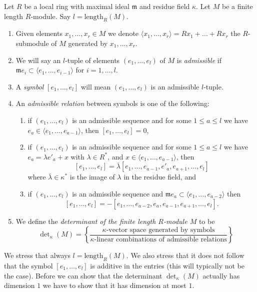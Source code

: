 \begin{definition}
\label{definition-determinant}
Let $R$ be a local ring with maximal ideal $\mathfrak m$ and
residue field $\kappa$. Let $M$ be a finite length $R$-module.
Say $l = \text{length}_R(M)$.
\begin{enumerate}
\item Given elements $x_1, \ldots, x_r \in M$ we denote
$\langle x_1, \ldots, x_r \rangle = Rx_1 + \ldots + Rx_r$ the
$R$-submodule of $M$ generated by $x_1, \ldots, x_r$.
\item We will say an $l$-tuple of elements
$(e_1, \ldots, e_l)$ of $M$ is {\it admissible} if
$\mathfrak m e_i \subset \langle e_1, \ldots, e_{i - 1} \rangle$
for $i = 1, \ldots, l$.
\item A {\it symbol} $[e_1, \ldots, e_l]$ will mean
$(e_1, \ldots, e_l)$ is an admissible $l$-tuple.
\item An {\it admissible relation} between symbols is one of the following:
\begin{enumerate}
\item if $(e_1, \ldots, e_l)$ is an admissible sequence and
for some $1 \leq a \leq l$ we have
$e_a \in \langle e_1, \ldots, e_{a - 1}\rangle$, then
$[e_1, \ldots, e_l] = 0$,
\item if $(e_1, \ldots, e_l)$ is an admissible sequence and
for some $1 \leq a \leq l$ we have $e_a = \lambda e'_a + x$
with $\lambda \in R^*$, and
$x \in \langle e_1, \ldots, e_{a - 1}\rangle$, then
$$
[e_1, \ldots, e_l] =
\overline{\lambda} [e_1, \ldots, e_{a - 1}, e'_a, e_{a + 1}, \ldots, e_l]
$$
where $\overline{\lambda} \in \kappa^*$ is the image of $\lambda$ in
the residue field, and
\item if $(e_1, \ldots, e_l)$ is an admissible sequence and
$\mathfrak m e_a \subset \langle e_1, \ldots, e_{a - 2}\rangle$ then
$$
[e_1, \ldots, e_l] =
- [e_1, \ldots, e_{a - 2}, e_a, e_{a - 1}, e_{a + 1}, \ldots, e_l].
$$
\end{enumerate}
\item
We define the {\it determinant of the finite length $R$-module $M$} to be
$$
\det\nolimits_\kappa(M) =
\left\{
\frac{\kappa\text{-vector space generated by symbols}}
{\kappa\text{-linear combinations of admissible relations}}
\right\}
$$
\end{enumerate}
\end{definition}

\noindent
We stress that always $l = \text{length}_R(M)$. We also stress that
it does not follow that the symbol $[e_1, \ldots, e_l]$ is
additive in the entries (this will typically not be the case).
Before we can show that the determinant $\det_\kappa(M)$ actually
has dimension $1$ we have to show that it has dimension at most $1$.

